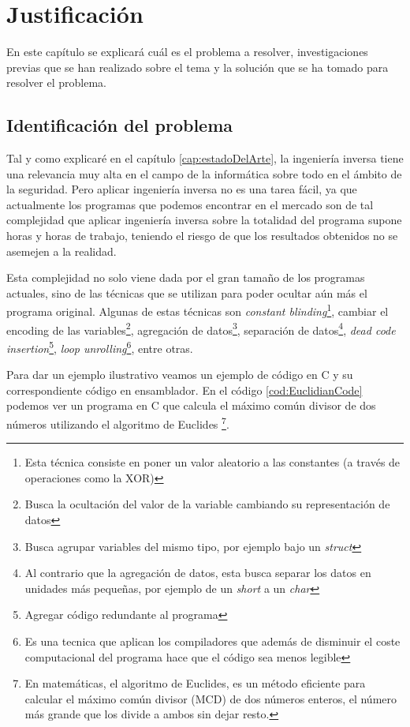 \chapter{Justificación}
\label{cap:justificacion}


En este capítulo se explicará cuál es el problema a resolver, investigaciones previas
que se han realizado sobre el tema y la solución que se ha tomado para resolver el problema.

\section{Identificación del problema}
\label{sec:problema}


Tal y como explicaré en el capítulo \ref{cap:estadoDelArte}, la ingeniería inversa tiene
una relevancia muy alta en el campo de la informática sobre todo en el ámbito de la
seguridad. Pero aplicar ingeniería inversa no es una tarea fácil, ya que actualmente
los programas que podemos encontrar en el mercado son de tal complejidad que aplicar
ingeniería inversa sobre la totalidad del programa supone horas y horas de trabajo,
teniendo el riesgo de que los resultados obtenidos no se asemejen a la realidad.

Esta complejidad no solo viene dada por el gran tamaño de los programas actuales, sino
de las técnicas que se utilizan para poder ocultar aún más el programa original. Algunas
de estas técnicas son \textit{constant blinding}\footnote{Esta técnica consiste en poner
un valor aleatorio a las constantes (a través de operaciones como la XOR)}, cambiar el
encoding de las variables\footnote{Busca la ocultación del valor de la variable cambiando
su representación de datos}, agregación de datos\footnote{Busca agrupar variables del mismo
tipo, por ejemplo bajo un \textit{struct}}, separación de datos\footnote{Al contrario que
la agregación de datos, esta busca separar los datos en unidades más pequeñas, por ejemplo
de un \textit{short} a un \textit{char}}, \textit{dead code insertion}\footnote{Agregar
código redundante al programa}, \textit{loop unrolling}\footnote{Es una tecnica que aplican
los compiladores que además de disminuir el coste computacional del programa hace que el
código sea menos legible}, entre otras. \cite{TecnicasIlegibleBinario}

Para dar un ejemplo ilustrativo veamos un ejemplo de código en C y su correspondiente
código en ensamblador. En el código \ref{cod:EuclidianCode} podemos ver un programa en C
que calcula el máximo común divisor de dos números utilizando el algoritmo de Euclides
\footnote{En matemáticas, el algoritmo de Euclides, es un método eficiente para calcular
el máximo común divisor (MCD) de dos números enteros, el número más grande que los divide
a ambos sin dejar resto.}.

